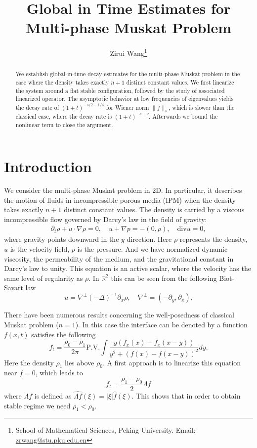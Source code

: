 \documentclass[11pt]{article}
\title{Global in Time Estimates for Multi-phase Muskat Problem}
\author{Zirui Wang\footnote{School of Mathematical Sciences, Peking University. Email: \href{zrwang@stu.pku.edu.cn}{zrwang@stu.pku.edu.cn}}}
\date{}
\newcommand{\PV}{\mathrm{P.V.}}
\theoremstyle{definition}
\numberwithin{equation}{section}
\begin{document}
\maketitle

\begin{abstract}
    We establish global-in-time decay estimates for the multi-phase Muskat problem in the case where the density takes exactly \(n+1\) distinct constant values. We first linearize the system around a flat stable configuration, followed by the study of associated linearized operator. The asymptotic behavior at low frequencies of eigenvalues yields the decay rate of $(1+t)^{-s/2-1/4}$ for Wiener norm $\|f\|_s$, which is slower than the classical case, where the decay rate is $(1+t)^{-s+\nu}$. Afterwards we bound the nonlinear term to close the argument.
\end{abstract}

\section{Introduction}
We consider the multi-phase Muskat problem in 2D. In particular, it describes the motion of fluids in incompressible porous media (IPM) \cite{Bear1975DynamicsOF,10.1063/1.1710292} when the density takes exactly 
$n+1$ distinct constant values. The density is carried by a viscous incompressible flow governed by Darcy's law in the field of gravity:
\begin{align}\label{IPM equation}
    \partial_t\rho+u\cdot\nabla\rho=0,\quad u+\nabla p=-(0,\rho),\quad \text{div}u=0,
\end{align}
where gravity points downward in the $y$ direction. Here $\rho$ represents the density, $u$ is the velocity field, $p$ is the pressure. And we have normalized dynamic viscosity, the permeability of the medium, and the gravitational constant in Darcy's law to unity. This equation is an active scalar, where the velocity has the same level of regularity as $\rho$. In $\mathbb{R}^2$ this can be seen from the following Biot-Savart law
\begin{equation}\label{BS Law}
    u=\nabla^{\perp}(-\Delta)^{-1}\partial_x\rho,\quad\nabla^{\perp}=(-\partial_y,\partial_x).
\end{equation}

There have been numerous results concerning the well-posedness of classical Muskat problem ($n=1$). In this case the interface can be denoted by a function $f(x,t)$ satisfies the following
\begin{equation}
    f_t=\frac{\rho_0-\rho_1}{2\pi}\PV\int\frac{y\left(f_x(x)-f_x(x-y)\right)}{y^2+\left(f(x)-f(x-y)\right)^2}dy.
\end{equation}
Here the density $\rho_1$ lies above $\rho_0$. A first approach is to linearize this equation near $f=0$, which leads to
\begin{equation}
    f_t=\frac{\rho_1-\rho_0}{2}\Lambda f
\end{equation}
where $\Lambda f$ is defined as 
$\widehat{\Lambda f}(\xi)=|\xi|\widehat{f}(\xi)$. This shows that in order to obtain stable regime we need $\rho_1<\rho_0$.
\end{document}

